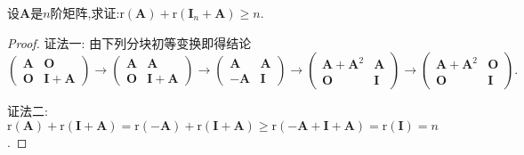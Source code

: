 \documentclass[../../main.tex]{subfiles}
\begin{document}
\begin{example}
设\(\boldsymbol{A}\)是\(n\)阶矩阵,求证:\(\mathrm{r}(\boldsymbol{A})+\mathrm{r}(\boldsymbol{I}_n+\boldsymbol{A})\geqslant  n\).
\end{example}
\begin{proof}
{\color{blue}证法一:}
由下列分块初等变换即得结论
\[
\begin{pmatrix}
\boldsymbol{A}&\boldsymbol{O}\\
\boldsymbol{O}&\boldsymbol{I}+\boldsymbol{A}
\end{pmatrix}\to
\begin{pmatrix}
\boldsymbol{A}&\boldsymbol{A}\\
\boldsymbol{O}&\boldsymbol{I}+\boldsymbol{A}
\end{pmatrix}\to
\begin{pmatrix}
\boldsymbol{A}&\boldsymbol{A}\\
-\boldsymbol{A}&\boldsymbol{I}
\end{pmatrix}\to
\begin{pmatrix}
\boldsymbol{A}+\boldsymbol{A}^2&\boldsymbol{A}\\
\boldsymbol{O}&\boldsymbol{I}
\end{pmatrix}\to
\begin{pmatrix}
\boldsymbol{A}+\boldsymbol{A}^2&\boldsymbol{O}\\
\boldsymbol{O}&\boldsymbol{I}
\end{pmatrix}.
\]

{\color{blue}证法二:}
\(\mathrm{r}(\boldsymbol{A})+\mathrm{r}(\boldsymbol{I}+\boldsymbol{A})=\mathrm{r}(-\boldsymbol{A})+\mathrm{r}(\boldsymbol{I}+\boldsymbol{A})\geqslant \mathrm{r}(-\boldsymbol{A}+\boldsymbol{I}+\boldsymbol{A})=\mathrm{r}(\boldsymbol{I}) = n\).
\end{proof}
\end{document}
